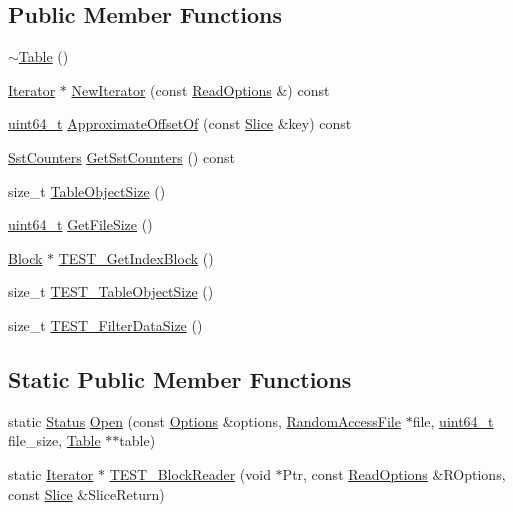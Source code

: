 \subsection*{Public Member Functions}
\begin{DoxyCompactItemize}
\item 
\hyperlink{classleveldb_1_1_table_a945f1f97b4f53402f5d55422a4dd3af2}{$\sim$\+Table} ()
\item 
\hyperlink{classleveldb_1_1_iterator}{Iterator} $\ast$ \hyperlink{classleveldb_1_1_table_ad354f57ece050ca0c5f42669b7c01cc2}{New\+Iterator} (const \hyperlink{structleveldb_1_1_read_options}{Read\+Options} \&) const 
\item 
\hyperlink{stdint_8h_aaa5d1cd013383c889537491c3cfd9aad}{uint64\+\_\+t} \hyperlink{classleveldb_1_1_table_a1795d45c54945ee7652b19e6ad6c030b}{Approximate\+Offset\+Of} (const \hyperlink{classleveldb_1_1_slice}{Slice} \&key) const 
\item 
\hyperlink{classleveldb_1_1_sst_counters}{Sst\+Counters} \hyperlink{classleveldb_1_1_table_aa79a6b167fe2f5db29df7b48a6534fb2}{Get\+Sst\+Counters} () const 
\item 
size\+\_\+t \hyperlink{classleveldb_1_1_table_a4d57df815fb70a21e5ec3633c2d6a09d}{Table\+Object\+Size} ()
\item 
\hyperlink{stdint_8h_aaa5d1cd013383c889537491c3cfd9aad}{uint64\+\_\+t} \hyperlink{classleveldb_1_1_table_a9f1f51743595d1a6d1d6ded8a15f48b3}{Get\+File\+Size} ()
\item 
\hyperlink{classleveldb_1_1_block}{Block} $\ast$ \hyperlink{classleveldb_1_1_table_ab8fc55186dc87c421a64482fc596adc5}{T\+E\+S\+T\+\_\+\+Get\+Index\+Block} ()
\item 
size\+\_\+t \hyperlink{classleveldb_1_1_table_a688a3f48175793353eb24bdbe6e00040}{T\+E\+S\+T\+\_\+\+Table\+Object\+Size} ()
\item 
size\+\_\+t \hyperlink{classleveldb_1_1_table_afaf17c04dc35485bddee302bc26313b3}{T\+E\+S\+T\+\_\+\+Filter\+Data\+Size} ()
\end{DoxyCompactItemize}
\subsection*{Static Public Member Functions}
\begin{DoxyCompactItemize}
\item 
static \hyperlink{classleveldb_1_1_status}{Status} \hyperlink{classleveldb_1_1_table_aa25d0e074ab4de46e583522a8c0e9582}{Open} (const \hyperlink{structleveldb_1_1_options}{Options} \&options, \hyperlink{classleveldb_1_1_random_access_file}{Random\+Access\+File} $\ast$file, \hyperlink{stdint_8h_aaa5d1cd013383c889537491c3cfd9aad}{uint64\+\_\+t} file\+\_\+size, \hyperlink{classleveldb_1_1_table}{Table} $\ast$$\ast$table)
\item 
static \hyperlink{classleveldb_1_1_iterator}{Iterator} $\ast$ \hyperlink{classleveldb_1_1_table_ad9cb93a02a3b0feb53ae5621939367aa}{T\+E\+S\+T\+\_\+\+Block\+Reader} (void $\ast$Ptr, const \hyperlink{structleveldb_1_1_read_options}{Read\+Options} \&R\+Options, const \hyperlink{classleveldb_1_1_slice}{Slice} \&Slice\+Return)
\end{DoxyCompactItemize}
